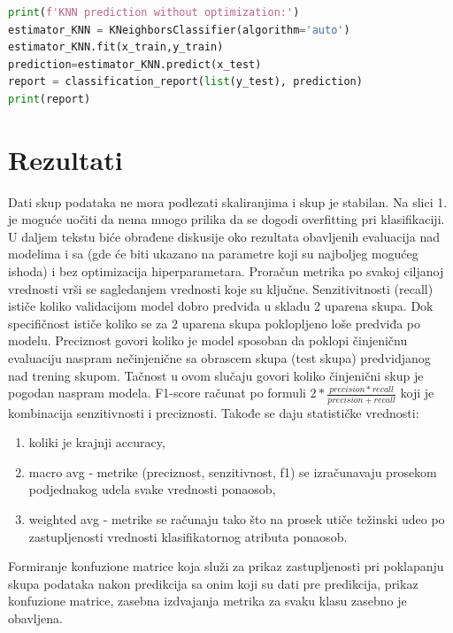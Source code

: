 \documentclass[fontsize=12bp, paper=a4]{scrarticle}
\renewcommand\lstlistingname{Implementacija}
\renewcommand\lstlistlistingname{Implementacija}
\begin{document}
\begin{lstlisting}[language=Python, caption=kNN bez ikakvih optimizacija hiperparametara.]
print(f'KNN prediction without optimization:')
estimator_KNN = KNeighborsClassifier(algorithm='auto')
estimator_KNN.fit(x_train,y_train)
prediction=estimator_KNN.predict(x_test)
report = classification_report(list(y_test), prediction)
print(report)
\end{lstlisting}


\newpage
\section{Rezultati}

\renewcommand\lstlistingname{Izlaz}
\renewcommand\lstlistlistingname{Izlaz}
\setcounter{lstlisting}{0}
Dati skup podataka ne mora podlezati skaliranjima i skup je stabilan. Na slici 1. je moguće uočiti da nema mnogo prilika da se dogodi overfitting pri klasifikaciji.
U daljem tekstu biće obrađene diskusije oko rezultata obavljenih evaluacija nad modelima i sa (gde će biti ukazano na parametre koji su najboljeg mogućeg ishoda) i bez optimizacija hiperparametara. Proračun metrika po svakoj ciljanoj vrednosti vrši se sagledanjem vrednosti koje su ključne. Senzitivitnosti (recall) ističe koliko validacijom model dobro predviđa u skladu 2 uparena skupa. Dok specifičnost ističe koliko se za 2 uparena skupa poklopljeno loše predviđa po modelu. Preciznost govori koliko je model sposoban da poklopi činjeničnu evaluaciju naspram nečinjenične sa obrascem skupa (test skupa) predvidjanog nad trening skupom. Tačnost u ovom slučaju govori koliko činjenični skup je pogodan naspram modela. F1-score računat po formuli $2*\frac{precision*recall}{precision+recall}$ koji je kombinacija senzitivnosti i preciznosti. Takođe se daju statističke vrednosti:
\begin{enumerate}
    \item koliki je krajnji accuracy,
    \item macro avg - metrike (preciznost, senzitivnost, f1) se izračunavaju prosekom podjednakog udela svake vrednosti ponaosob,\cite{metrics1}\cite{metrics2}
    \item weighted avg - metrike se računaju tako što na prosek utiče težinski udeo po zastupljenosti vrednosti klasifikatornog atributa ponaosob.
\end{enumerate}
Formiranje konfuzione matrice koja služi za prikaz zastupljenosti pri poklapanju skupa podataka nakon predikcija sa onim koji su dati pre predikcija, prikaz konfuzione matrice, zasebna izdvajanja metrika  za svaku klasu zasebno je obavljena.
\end{document}
